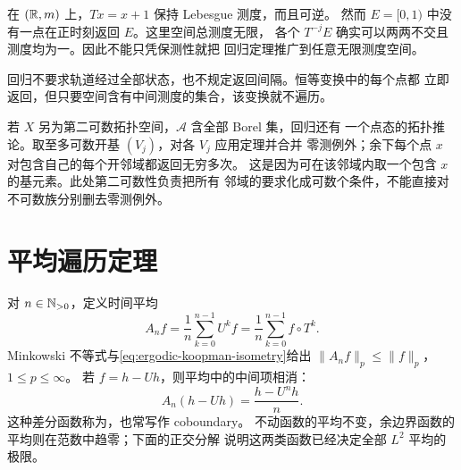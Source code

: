 \begin{counterexample}\label{ex:recurrence-infinite-measure}
在 $(\mathbb{R},m)$ 上，$Tx=x+1$ 保持 Lebesgue 测度，而且可逆。
然而 $E=[0,1)$ 中没有一点在正时刻返回 $E$。这里空间总测度无限，
各个 $T^{-j}E$ 确实可以两两不交且测度均为一。因此不能只凭保测性就把
回归定理推广到任意无限测度空间。
\end{counterexample}

回归不要求轨道经过全部状态，也不规定返回间隔。恒等变换中的每个点都
立即返回，但只要空间含有中间测度的集合，该变换就不遍历。

若 $X$ 另为第二可数拓扑空间，$\mathcal A$ 含全部 Borel 集，回归还有
一个点态的拓扑推论。取至多可数开基 $(V_j)$，对各 $V_j$ 应用定理并合并
零测例外；余下每个点 $x$ 对包含自己的每个开邻域都返回无穷多次。
这是因为可在该邻域内取一个包含 $x$ 的基元素。此处第二可数性负责把所有
邻域的要求化成可数个条件，不能直接对不可数族分别删去零测例外。

\section{平均遍历定理}
\label{sec:mean-ergodic-theorem}

对 $n\in\mathbb{N}_{>0}$，定义时间平均
\begin{equation}\label{eq:ergodic-time-average}
 A_nf=\frac1n\sum_{k=0}^{n-1}U^kf
     =\frac1n\sum_{k=0}^{n-1}f\circ T^k.
\end{equation}
Minkowski 不等式与\eqref{eq:ergodic-koopman-isometry}给出
$\|A_nf\|_p\le\|f\|_p$，$1\le p\le\infty$。
若 $f=h-Uh$，则平均中的中间项相消：
\begin{equation}\label{eq:ergodic-coboundary-average}
 A_n(h-Uh)=\frac{h-U^nh}{n}.
\end{equation}
这种差分函数称为，也常写作 coboundary。
不动函数的平均不变，余边界函数的平均则在范数中趋零；下面的正交分解
说明这两类函数已经决定全部 $L^2$ 平均的极限。

